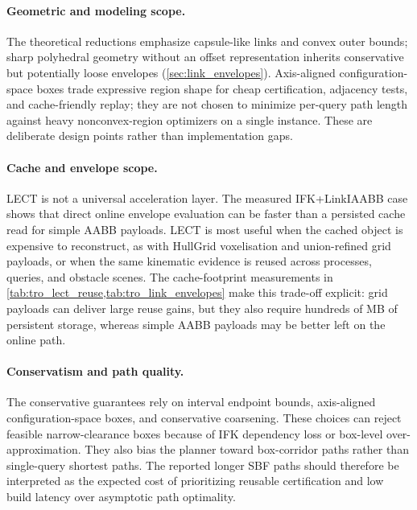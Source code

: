 \documentclass[journal]{IEEEtran}
\begin{document}
\paragraph{Geometric and modeling scope.}
The theoretical reductions emphasize capsule-like links and convex outer bounds;
sharp polyhedral geometry without an offset representation inherits conservative
but potentially loose envelopes (\cref{sec:link_envelopes}). Axis-aligned
configuration-space boxes trade expressive region shape for cheap certification,
adjacency tests, and cache-friendly replay; they are not chosen to minimize
per-query path length against heavy nonconvex-region optimizers on a single
instance. These are deliberate design points rather than implementation gaps.

\paragraph{Cache and envelope scope.}
LECT is not a universal acceleration layer. The measured IFK+LinkIAABB case
shows that direct online envelope evaluation can be faster than a persisted
cache read for simple AABB payloads. LECT is most useful when the cached object
is expensive to reconstruct, as with HullGrid voxelisation and union-refined
grid payloads, or when the same kinematic evidence is reused across processes,
queries, and obstacle scenes. The cache-footprint measurements in
\cref{tab:tro_lect_reuse,tab:tro_link_envelopes} make this trade-off explicit: grid payloads
can deliver large reuse gains, but they also require hundreds of MB of
persistent storage, whereas simple AABB payloads may be better left on the
online path.

\paragraph{Conservatism and path quality.}
The conservative guarantees rely on interval endpoint bounds, axis-aligned
configuration-space boxes, and conservative coarsening. These choices can reject
feasible narrow-clearance boxes because of IFK dependency loss or box-level
over-approximation. They also bias the planner toward box-corridor paths rather
than single-query shortest paths. The reported longer SBF paths should therefore
be interpreted as the expected cost of prioritizing reusable certification and
low build latency over asymptotic path optimality.
\end{document}
